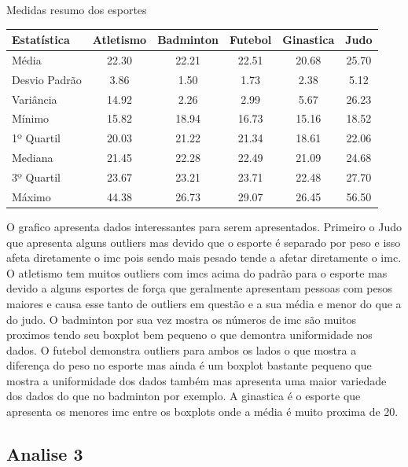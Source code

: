 \documentclass[
]{estat/estat}
\begin{document}
\begin{quadro}[H]
\caption{Medidas resumo dos esportes}
\centering
\begin{tabular}{| l |
            S[table-format = 2.2]
            S[table-format = 1.2]
            S[table-format = 2.2]
            S[table-format = 2.2]
            S[table-format = 2.2]
            |}
    \toprule
        \textbf{Estatística} & \textbf{Atletismo} & \textbf{Badminton} & \textbf{Futebol} & \textbf{Ginastica} & \textbf{Judo} \\
        \midrule
        Média & 22.30 & 22.21 & 22.51 & 20.68 & 25.70 \\
        Desvio Padrão & 3.86 & 1.50 & 1.73 & 2.38 & 5.12 \\
        Variância & 14.92 & 2.26 & 2.99 & 5.67 & 26.23 \\
        Mínimo & 15.82 & 18.94 & 16.73 & 15.16 & 18.52 \\
        1º Quartil & 20.03 & 21.22 & 21.34 & 18.61 & 22.06 \\
        Mediana & 21.45 & 22.28 & 22.49 & 21.09 & 24.68 \\
        3º Quartil & 23.67 & 23.21 & 23.71 & 22.48 & 27.70 \\
        Máximo & 44.38 & 26.73 & 29.07 & 26.45 & 56.50 \\
    \bottomrule
    \end{tabular}
    
\end{quadro}

O grafico apresenta dados interessantes para serem apresentados.
Primeiro o Judo que apresenta alguns outliers mas devido que o esporte é
separado por peso e isso afeta diretamente o imc pois sendo mais pesado
tende a afetar diretamente o imc. O atletismo tem muitos outliers com
imcs acima do padrão para o esporte mas devido a alguns esportes de
força que geralmente apresentam pessoas com pesos maiores e causa esse
tanto de outliers em questão e a sua média e menor do que a do judo. O
badminton por sua vez mostra os números de imc são muitos proximos tendo
seu boxplot bem pequeno o que demontra uniformidade nos dados. O futebol
demonstra outliers para ambos os lados o que mostra a diferença do peso
no esporte mas ainda é um boxplot bastante pequeno que mostra a
uniformidade dos dados também mas apresenta uma maior variedade dos
dados do que no badminton por exemplo. A ginastica é o esporte que
apresenta os menores imc entre os boxplots onde a média é muito proxima
de 20.

\subsection{Analise 3}\label{analise-3}
\end{document}
